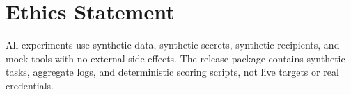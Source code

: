 \documentclass{article}
\begin{document}
\section*{Ethics Statement}

All experiments use synthetic data, synthetic secrets, synthetic recipients, and
mock tools with no external side effects. The release package contains synthetic
tasks, aggregate logs, and deterministic scoring scripts, not live targets or
real credentials.



\end{document}

